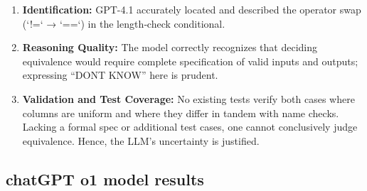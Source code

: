 \begin{enumerate}
  \item \textbf{Identification:}  
    GPT-4.1 accurately located and described the operator swap (`!=` → `==`) in the length‐check conditional.
  
  \item \textbf{Reasoning Quality:}  
    The model correctly recognizes that deciding equivalence would require complete specification of valid inputs and outputs; expressing “DONT KNOW” here is prudent.
  
  \item \textbf{Validation and Test Coverage:}  
    No existing tests verify both cases where columns are uniform and where they differ in tandem with name checks. Lacking a formal spec or additional test cases, one cannot conclusively judge equivalence. Hence, the LLM’s uncertainty is justified.
\end{enumerate}




\subsection{chatGPT o1 model results}

